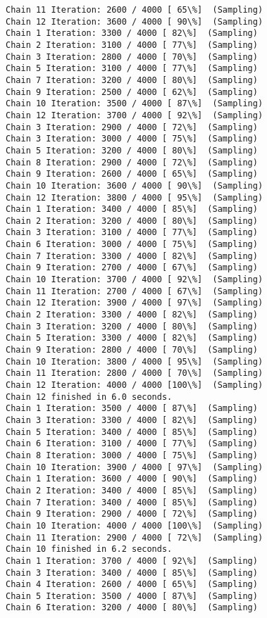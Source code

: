 \documentclass[11pt]{article}
\begin{document}
\begin{Verbatim}[commandchars=\\\{\}]
Chain 11 Iteration: 2600 / 4000 [ 65\%]  (Sampling)
Chain 12 Iteration: 3600 / 4000 [ 90\%]  (Sampling)
Chain 1 Iteration: 3300 / 4000 [ 82\%]  (Sampling)
Chain 2 Iteration: 3100 / 4000 [ 77\%]  (Sampling)
Chain 3 Iteration: 2800 / 4000 [ 70\%]  (Sampling)
Chain 5 Iteration: 3100 / 4000 [ 77\%]  (Sampling)
Chain 7 Iteration: 3200 / 4000 [ 80\%]  (Sampling)
Chain 9 Iteration: 2500 / 4000 [ 62\%]  (Sampling)
Chain 10 Iteration: 3500 / 4000 [ 87\%]  (Sampling)
Chain 12 Iteration: 3700 / 4000 [ 92\%]  (Sampling)
Chain 3 Iteration: 2900 / 4000 [ 72\%]  (Sampling)
Chain 3 Iteration: 3000 / 4000 [ 75\%]  (Sampling)
Chain 5 Iteration: 3200 / 4000 [ 80\%]  (Sampling)
Chain 8 Iteration: 2900 / 4000 [ 72\%]  (Sampling)
Chain 9 Iteration: 2600 / 4000 [ 65\%]  (Sampling)
Chain 10 Iteration: 3600 / 4000 [ 90\%]  (Sampling)
Chain 12 Iteration: 3800 / 4000 [ 95\%]  (Sampling)
Chain 1 Iteration: 3400 / 4000 [ 85\%]  (Sampling)
Chain 2 Iteration: 3200 / 4000 [ 80\%]  (Sampling)
Chain 3 Iteration: 3100 / 4000 [ 77\%]  (Sampling)
Chain 6 Iteration: 3000 / 4000 [ 75\%]  (Sampling)
Chain 7 Iteration: 3300 / 4000 [ 82\%]  (Sampling)
Chain 9 Iteration: 2700 / 4000 [ 67\%]  (Sampling)
Chain 10 Iteration: 3700 / 4000 [ 92\%]  (Sampling)
Chain 11 Iteration: 2700 / 4000 [ 67\%]  (Sampling)
Chain 12 Iteration: 3900 / 4000 [ 97\%]  (Sampling)
Chain 2 Iteration: 3300 / 4000 [ 82\%]  (Sampling)
Chain 3 Iteration: 3200 / 4000 [ 80\%]  (Sampling)
Chain 5 Iteration: 3300 / 4000 [ 82\%]  (Sampling)
Chain 9 Iteration: 2800 / 4000 [ 70\%]  (Sampling)
Chain 10 Iteration: 3800 / 4000 [ 95\%]  (Sampling)
Chain 11 Iteration: 2800 / 4000 [ 70\%]  (Sampling)
Chain 12 Iteration: 4000 / 4000 [100\%]  (Sampling)
Chain 12 finished in 6.0 seconds.
Chain 1 Iteration: 3500 / 4000 [ 87\%]  (Sampling)
Chain 3 Iteration: 3300 / 4000 [ 82\%]  (Sampling)
Chain 5 Iteration: 3400 / 4000 [ 85\%]  (Sampling)
Chain 6 Iteration: 3100 / 4000 [ 77\%]  (Sampling)
Chain 8 Iteration: 3000 / 4000 [ 75\%]  (Sampling)
Chain 10 Iteration: 3900 / 4000 [ 97\%]  (Sampling)
Chain 1 Iteration: 3600 / 4000 [ 90\%]  (Sampling)
Chain 2 Iteration: 3400 / 4000 [ 85\%]  (Sampling)
Chain 7 Iteration: 3400 / 4000 [ 85\%]  (Sampling)
Chain 9 Iteration: 2900 / 4000 [ 72\%]  (Sampling)
Chain 10 Iteration: 4000 / 4000 [100\%]  (Sampling)
Chain 11 Iteration: 2900 / 4000 [ 72\%]  (Sampling)
Chain 10 finished in 6.2 seconds.
Chain 1 Iteration: 3700 / 4000 [ 92\%]  (Sampling)
Chain 3 Iteration: 3400 / 4000 [ 85\%]  (Sampling)
Chain 4 Iteration: 2600 / 4000 [ 65\%]  (Sampling)
Chain 5 Iteration: 3500 / 4000 [ 87\%]  (Sampling)
Chain 6 Iteration: 3200 / 4000 [ 80\%]  (Sampling)

\end{Verbatim}
\end{document}
